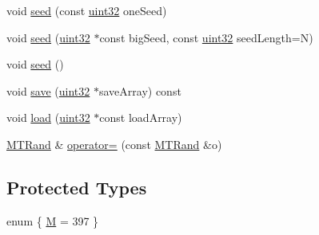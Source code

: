 \begin{DoxyCompactItemize}
\item 
void \hyperlink{classMTRand_a1e21a79e0a30225fffe924229e34a923}{seed} (const \hyperlink{classMTRand_a45478edf9e24dcd2a5164bac3889d6a2}{uint32} oneSeed)
\item 
void \hyperlink{classMTRand_a5758103776b131e8ea46b6dc1b9fb267}{seed} (\hyperlink{classMTRand_a45478edf9e24dcd2a5164bac3889d6a2}{uint32} $\ast$const bigSeed, const \hyperlink{classMTRand_a45478edf9e24dcd2a5164bac3889d6a2}{uint32} seedLength=N)
\item 
void \hyperlink{classMTRand_ad88ea3363d55bafb62826bbd130279c2}{seed} ()
\item 
void \hyperlink{classMTRand_ad60e0f3f5c90baab75b74f9a2ccae871}{save} (\hyperlink{classMTRand_a45478edf9e24dcd2a5164bac3889d6a2}{uint32} $\ast$saveArray) const 
\item 
void \hyperlink{classMTRand_a8302e9a8cd16d8dfc536a85bf2f68be0}{load} (\hyperlink{classMTRand_a45478edf9e24dcd2a5164bac3889d6a2}{uint32} $\ast$const loadArray)
\item 
\hyperlink{classMTRand}{MTRand} \& \hyperlink{classMTRand_a3a6eb21add6f6ef4ce2d3280f2518521}{operator=} (const \hyperlink{classMTRand}{MTRand} \&o)
\end{DoxyCompactItemize}
\subsection*{Protected Types}
\begin{DoxyCompactItemize}
\item 
enum \{ \hyperlink{classMTRand_a10c3437be98225f5b0beee1ed8c033c8a133070000b798889cd75535ea0d5bb71}{M} =  397
 \}
\end{DoxyCompactItemize}
